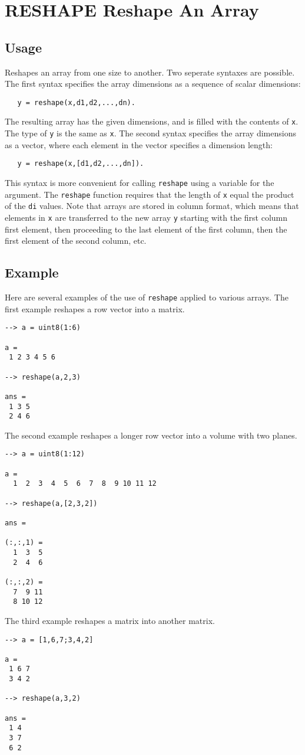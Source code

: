 \section{RESHAPE Reshape An Array}

\subsection{Usage}

Reshapes an array from one size to another. Two seperate 
syntaxes are possible.  The first syntax specifies the array 
dimensions as a sequence of scalar dimensions:
\begin{verbatim}
   y = reshape(x,d1,d2,...,dn).
\end{verbatim}
The resulting array has the given dimensions, and is filled with
the contents of \verb|x|.  The type of \verb|y| is the same as \verb|x|.  
The second syntax specifies the array dimensions as a vector,
where each element in the vector specifies a dimension length:
\begin{verbatim}
   y = reshape(x,[d1,d2,...,dn]).
\end{verbatim}
This syntax is more convenient for calling \verb|reshape| using a 
variable for the argument. The
\verb|reshape| function requires that the length of \verb|x| equal the product
of the \verb|di| values.
Note that arrays are stored in column format, 
which means that elements in \verb|x| are transferred to the new array
\verb|y| starting with the first column first element, then proceeding to 
the last element of the first column, then the first element of the
second column, etc.
\subsection{Example}

Here are several examples of the use of \verb|reshape| applied to
various arrays.  The first example reshapes a row vector into a 
matrix.
\begin{verbatim}
--> a = uint8(1:6)

a = 
 1 2 3 4 5 6 

--> reshape(a,2,3)

ans = 
 1 3 5 
 2 4 6 
\end{verbatim}
The second example reshapes a longer row vector into a volume with 
two planes.
\begin{verbatim}
--> a = uint8(1:12)

a = 
  1  2  3  4  5  6  7  8  9 10 11 12 

--> reshape(a,[2,3,2])

ans = 

(:,:,1) = 
  1  3  5 
  2  4  6 

(:,:,2) = 
  7  9 11 
  8 10 12 
\end{verbatim}
The third example reshapes a matrix into another matrix.
\begin{verbatim}
--> a = [1,6,7;3,4,2]

a = 
 1 6 7 
 3 4 2 

--> reshape(a,3,2)

ans = 
 1 4 
 3 7 
 6 2 
\end{verbatim}
